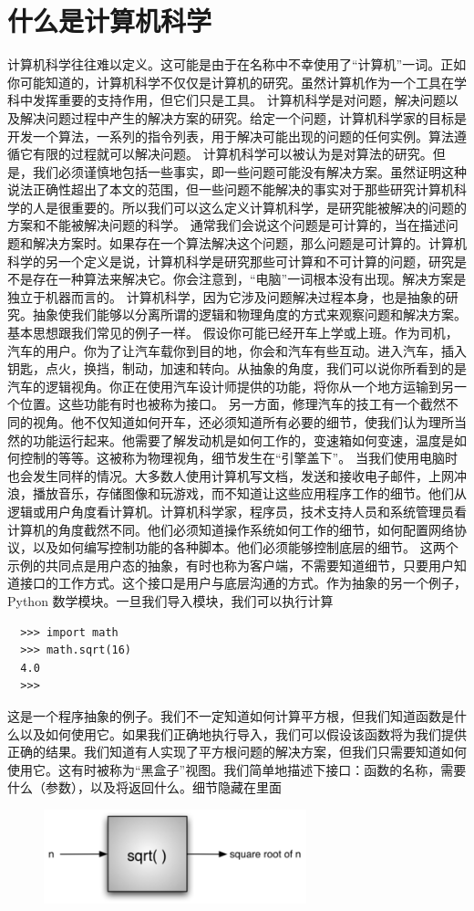 \section{什么是计算机科学}

计算机科学往往难以定义。这可能是由于在名称中不幸使用了“计算机”一词。正如你可能知道的，计算机科学不仅仅是计算机的研究。虽然计算机作为一个工具在学科中发挥重要的支持作用，但它们只是工具。
计算机科学是对问题，解决问题以及解决问题过程中产生的解决方案的研究。给定一个问题，计算机科学家的目标是开发一个算法，一系列的指令列表，用于解决可能出现的问题的任何实例。算法遵循它有限的过程就可以解决问题。
计算机科学可以被认为是对算法的研究。但是，我们必须谨慎地包括一些事实，即一些问题可能没有解决方案。虽然证明这种说法正确性超出了本文的范围，但一些问题不能解决的事实对于那些研究计算机科学的人是很重要的。所以我们可以这么定义计算机科学，是研究能被解决的问题的方案和不能被解决问题的科学。
通常我们会说这个问题是可计算的，当在描述问题和解决方案时。如果存在一个算法解决这个问题，那么问题是可计算的。计算机科学的另一个定义是说，计算机科学是研究那些可计算和不可计算的问题，研究是不是存在一种算法来解决它。你会注意到，“电脑”一词根本没有出现。解决方案是独立于机器而言的。
计算机科学，因为它涉及问题解决过程本身，也是抽象的研究。抽象使我们能够以分离所谓的逻辑和物理角度的方式来观察问题和解决方案。基本思想跟我们常见的例子一样。
假设你可能已经开车上学或上班。作为司机，汽车的用户。你为了让汽车载你到目的地，你会和汽车有些互动。进入汽车，插入钥匙，点火，换挡，制动，加速和转向。从抽象的角度，我们可以说你所看到的是汽车的逻辑视角。你正在使用汽车设计师提供的功能，将你从一个地方运输到另一个位置。这些功能有时也被称为接口。
另一方面，修理汽车的技工有一个截然不同的视角。他不仅知道如何开车，还必须知道所有必要的细节，使我们认为理所当然的功能运行起来。他需要了解发动机是如何工作的，变速箱如何变速，温度是如何控制的等等。这被称为物理视角，细节发生在“引擎盖下”。
当我们使用电脑时也会发生同样的情况。大多数人使用计算机写文档，发送和接收电子邮件，上网冲浪，播放音乐，存储图像和玩游戏，而不知道让这些应用程序工作的细节。他们从逻辑或用户角度看计算机。计算机科学家，程序员，技术支持人员和系统管理员看计算机的角度截然不同。他们必须知道操作系统如何工作的细节，如何配置网络协议，以及如何编写控制功能的各种脚本。他们必须能够控制底层的细节。
这两个示例的共同点是用户态的抽象，有时也称为客户端，不需要知道细节，只要用户知道接口的工作方式。这个接口是用户与底层沟通的方式。作为抽象的另一个例子，Python 数学模块。一旦我们导入模块，我们可以执行计算
\begin{lstlisting}
  >>> import math
  >>> math.sqrt(16)
  4.0
  >>>
\end{lstlisting}

这是一个程序抽象的例子。我们不一定知道如何计算平方根，但我们知道函数是什么以及如何使用它。如果我们正确地执行导入，我们可以假设该函数将为我们提供正确的结果。我们知道有人实现了平方根问题的解决方案，但我们只需要知道如何使用它。这有时被称为“黑盒子”视图。我们简单地描述下接口：函数的名称，需要什么（参数），以及将返回什么。细节隐藏在里面
\begin{figure}[htbp]
  \centering
  \includegraphics[width=3in]{images/blackbox.png}
\end{figure}
